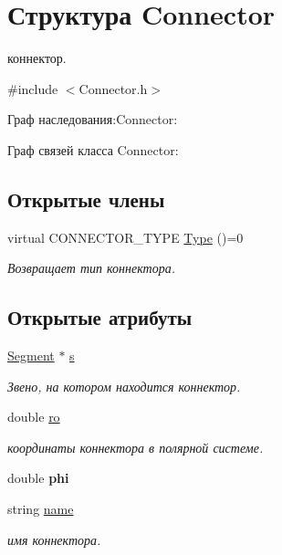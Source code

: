 \hypertarget{struct_connector}{
\section{Структура Connector}
\label{struct_connector}
}


коннектор.  




{\ttfamily \#include $<$Connector.h$>$}



Граф наследования:Connector:


Граф связей класса Connector:
\subsection*{Открытые члены}
\begin{DoxyCompactItemize}
\item 
virtual CONNECTOR\_\-TYPE \hyperlink{struct_connector_a8f03cd9d05863a3c6a41c5282f9e5208}{Type} ()=0
\begin{DoxyCompactList}\small\item\em Возвращает тип коннектора. \item\end{DoxyCompactList}\end{DoxyCompactItemize}
\subsection*{Открытые атрибуты}
\begin{DoxyCompactItemize}
\item 
\hypertarget{struct_connector_af120f4194a577a35d5f8b630cf41be6d}{
\hyperlink{class_segment}{Segment} $\ast$ \hyperlink{struct_connector_af120f4194a577a35d5f8b630cf41be6d}{s}}
\label{struct_connector_af120f4194a577a35d5f8b630cf41be6d}

\begin{DoxyCompactList}\small\item\em Звено, на котором находится коннектор. \item\end{DoxyCompactList}\item 
double \hyperlink{struct_connector_af5ac4b147ee893b40195fb36abda9a3d}{ro}
\begin{DoxyCompactList}\small\item\em координаты коннектора в полярной системе. \item\end{DoxyCompactList}\item 
\hypertarget{struct_connector_a55cd00b9d2cbb0e07430d8be63d7de78}{
double {\bfseries phi}}
\label{struct_connector_a55cd00b9d2cbb0e07430d8be63d7de78}

\item 
string \hyperlink{struct_connector_a2f236cf078849dbb78abc1fb8da87ace}{name}
\begin{DoxyCompactList}\small\item\em имя коннектора. \item\end{DoxyCompactList}\end{DoxyCompactItemize}


